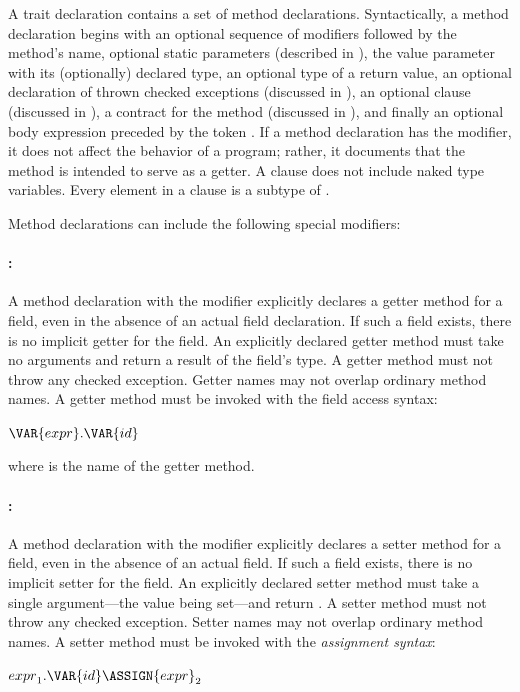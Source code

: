 A trait declaration contains a set of method declarations.
Syntactically, a method declaration begins with
an optional sequence of modifiers followed by
the method's name,
optional static parameters
(described in ),
the value parameter with its (optionally) declared type,
an optional type of a return value,
an optional declaration of thrown checked exceptions
(discussed in ),
an optional  clause
(discussed in ),
a contract for the method (discussed in ),
and finally an optional body expression preceded by the token \EXP{=}.
If a method declaration has the  modifier,
it does not affect the behavior of a program; rather,
it documents that the method is intended to serve as a getter.
A  clause does not include naked type variables.
Every element in a  clause is a subtype of
.


Method declarations can include the following special modifiers:
\paragraph{:}
A method declaration with the modifier  explicitly declares a
getter method for a field, even in the absence of an actual field declaration.
If such a field exists, there is no implicit getter for the field.
An explicitly declared getter method must take no arguments and return a
result of the field's type.
A getter method must not throw any checked exception.
Getter names may not overlap ordinary method names.
A getter method must be invoked with the field access syntax:
\begin{Fortress}
\(\VAR{expr}.\VAR{id}\)
\end{Fortress}
where  is the name of the getter method.



\paragraph{:}
A method declaration with the modifier  explicitly declares a
setter method for a field, even in the absence of an actual field.
If such a field exists, there is no implicit setter for the field.
An explicitly declared setter method must take a single argument---the
value being set---and return \EXP{()}.
A setter method must not throw any checked exception.
Setter names may not overlap ordinary method names.
A setter method must be invoked with the \emph{assignment syntax}:
\begin{Fortress}
\({expr}_{1}.\VAR{id} \ASSIGN {expr}_{2}\)
\end{Fortress}


